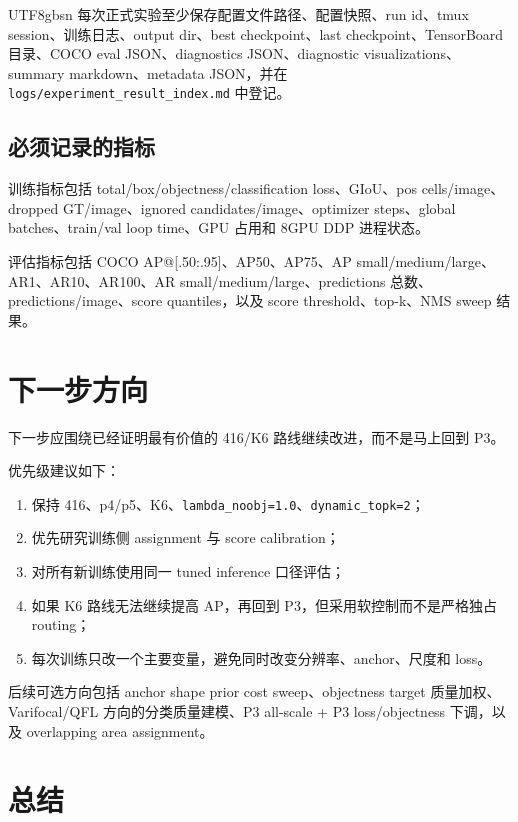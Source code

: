 \documentclass[11pt,a4paper]{article}
\begin{document}
\begin{CJK*}{UTF8}{gbsn}
每次正式实验至少保存配置文件路径、配置快照、run id、tmux session、训练日志、output dir、best checkpoint、last checkpoint、TensorBoard 目录、COCO eval JSON、diagnostics JSON、diagnostic visualizations、summary markdown、metadata JSON，并在 \texttt{logs/experiment\_result\_index.md} 中登记。

\subsection{必须记录的指标}

训练指标包括 total/box/objectness/classification loss、GIoU、pos cells/image、dropped GT/image、ignored candidates/image、optimizer steps、global batches、train/val loop time、GPU 占用和 8GPU DDP 进程状态。

评估指标包括 COCO AP@[.50:.95]、AP50、AP75、AP small/medium/large、AR1、AR10、AR100、AR small/medium/large、predictions 总数、predictions/image、score quantiles，以及 score threshold、top-k、NMS sweep 结果。

\section{下一步方向}

下一步应围绕已经证明最有价值的 416/K6 路线继续改进，而不是马上回到 P3。

优先级建议如下：

\begin{enumerate}[label=\arabic*.]
  \item 保持 416、p4/p5、K6、\texttt{lambda\_noobj=1.0}、\texttt{dynamic\_topk=2}；
  \item 优先研究训练侧 assignment 与 score calibration；
  \item 对所有新训练使用同一 tuned inference 口径评估；
  \item 如果 K6 路线无法继续提高 AP，再回到 P3，但采用软控制而不是严格独占 routing；
  \item 每次训练只改一个主要变量，避免同时改变分辨率、anchor、尺度和 loss。
\end{enumerate}

后续可选方向包括 anchor shape prior cost sweep、objectness target 质量加权、Varifocal/QFL 方向的分类质量建模、P3 all-scale + P3 loss/objectness 下调，以及 overlapping area assignment。

\section{总结}


\end{CJK*}
\end{document}
